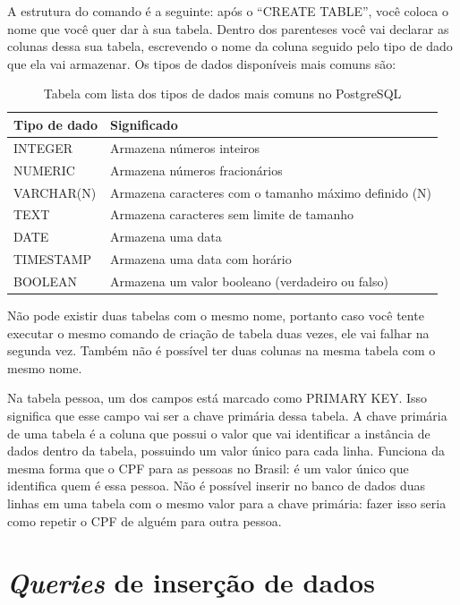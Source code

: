 \documentclass[
	12pt,				%
	openright,			%
	oneside,			%
	a4paper,			%
	english,			%
	french,				%
	spanish,			%
	brazil,				%
	]{abntex2}
\begin{document}
A estrutura do comando é a seguinte: após o ``CREATE TABLE'', você coloca o nome que você quer dar à sua tabela. Dentro dos parenteses você vai declarar as colunas dessa sua tabela, escrevendo o nome da coluna seguido pelo tipo de dado que ela vai armazenar. Os tipos de dados disponíveis mais comuns são:

\begin{table}[htb]
\center
\footnotesize
\begin{tabular}{|p{3cm}|p{9cm}|}
  \hline
   \textbf{Tipo de dado} & \textbf{Significado} \\
    \hline
    INTEGER & Armazena números inteiros \\
    \hline
    NUMERIC & Armazena números fracionários \\
    \hline
    VARCHAR(N) & Armazena caracteres com o tamanho máximo definido (N) \\
    \hline
    TEXT & Armazena caracteres sem limite de tamanho \\
    \hline
    DATE & Armazena uma data \\
    \hline
    TIMESTAMP & Armazena uma data com horário \\
    \hline
    BOOLEAN & Armazena um valor booleano (verdadeiro ou falso) \\
   \hline
\end{tabular}
\caption{Tabela com lista dos tipos de dados mais comuns no PostgreSQL}
\label{tiposdedados}
\end{table}

Não pode existir duas tabelas com o mesmo nome, portanto caso você tente executar o mesmo comando de criação de tabela duas vezes, ele vai falhar na segunda vez. Também não é possível ter duas colunas na mesma tabela com o mesmo nome. 

Na tabela pessoa, um dos campos está marcado como PRIMARY KEY. Isso significa que esse campo vai ser a chave primária dessa tabela. A chave primária de uma tabela é a coluna que possui o valor que vai identificar a instância de dados dentro da tabela, possuindo um valor único para cada linha. Funciona da mesma forma que o CPF para as pessoas no Brasil: é um valor único que identifica quem é essa pessoa. Não é possível inserir no banco de dados duas linhas em uma tabela com o mesmo valor para a chave primária: fazer isso seria como repetir o CPF de alguém para outra pessoa.

\section{\textit{Queries} de inserção de dados}
\end{document}
